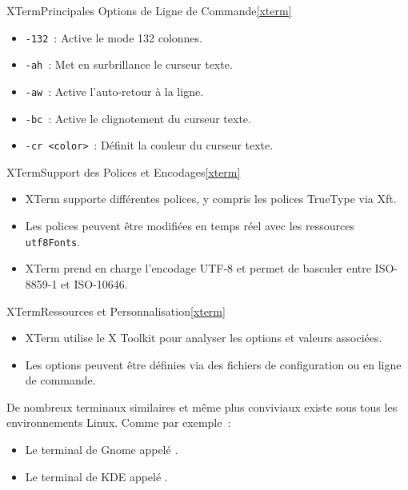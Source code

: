 \documentclass{beamer}
\begin{document}
    \begin{frame}{XTerm}{Principales Options de Ligne de Commande\cref{xterm}}
        \begin{itemize}
            \item \lstinline{-132}~: Active le mode 132 colonnes.
            \item \lstinline{-ah}~: Met en surbrillance le curseur texte.
            \item \lstinline{-aw}~: Active l'auto-retour à la ligne.
            \item \lstinline{-bc}~: Active le clignotement du curseur texte.
            \item \lstinline{-cr <color>}~: Définit la couleur du curseur texte.
        \end{itemize}
    \end{frame}

    \begin{frame}{XTerm}{Support des Polices et Encodages\cref{xterm}}
        \begin{itemize}
            \item XTerm supporte différentes polices, y compris les polices TrueType via Xft.
            \item Les polices peuvent être modifiées en temps réel avec les ressources \lstinline{utf8Fonts}.
            \item XTerm prend en charge l'encodage UTF-8 et permet de basculer entre ISO-8859-1 et ISO-10646.
        \end{itemize}
    \end{frame}

    \begin{frame}{XTerm}{Ressources et Personnalisation\cref{xterm}}
        \begin{itemize}
            \item XTerm utilise le X Toolkit pour analyser les options et valeurs associées.
            \item Les options peuvent être définies via des fichiers de configuration ou en ligne de commande.
        \end{itemize}
        \begin{dangercolorbox}
            De nombreux terminaux similaires et même plus conviviaux existe sous tous les environnements Linux.
            Comme par exemple~:
            \begin{itemize}
                \item Le terminal de Gnome appelé .
                \item Le terminal de KDE appelé .
            \end{itemize}
        \end{dangercolorbox}
    \end{frame}
\end{document}
